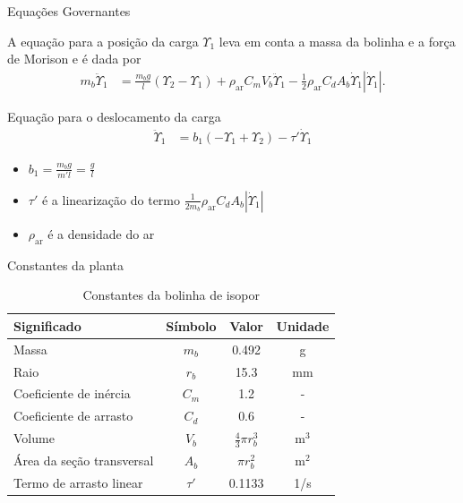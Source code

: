 \documentclass[10pt]{beamer}
\begin{document}
\begin{frame}[fragile]{Equações Governantes}
\begin{block}{}
A equação para a posição da carga $\Upsilon_1$ leva em conta a massa da bolinha e a força de Morison e é dada por \begin{align}
 	m_b \ddot{\Upsilon}_1 &= \frac{m_b g}{l}\left(\Upsilon_2 - \Upsilon_1\right) + \rho_{\mathrm{ar}} C_m V_b \ddot{\Upsilon}_1 - \frac{1}{2}\rho_{\textrm{ar}} C_d A_b \dot{\Upsilon}_1 \left|\dot{\Upsilon}_1\right|.\label{upsilon1previa}
 \end{align} 	
\end{block}

\begin{block}{Equação para o deslocamento da carga}
	\begin{align}
 	\ddot{\Upsilon}_1 &= b_1\left(-\Upsilon_1 + \Upsilon_2\right) - \tau'\dot{\Upsilon}_1\label{upsilon1final}
 \end{align}
\end{block}

\begin{itemize}
	\item $b_1 = \frac{m_b g}{m'l} = \frac{g}{l}$
	\item $\tau'$ é a linearização do termo $\frac{1}{2m_b}\rho_{\textrm{ar}} C_d A_b \left|\dot{\Upsilon}_1\right|$
	\item $\rho_{\textrm{ar}}$ é a densidade do ar
\end{itemize}
	
\end{frame}


\begin{frame}[fragile]{Constantes da planta}

\begin{block}{}
\begin{table}[!ht]
	\centering
	\caption{Constantes da bolinha de isopor\label{constanteIsopor}}
	\begin{tabular}{|l|c|c|c|}
		\hline
		\textbf{Significado} & \textbf{Símbolo} & \textbf{Valor} & \textbf{Unidade}\\ \hline \hline
		Massa & $m_{b}$ & 0.492 & g\\ \hline
		Raio & $r_{b}$ & 15.3 & mm\\ \hline
		Coeficiente de inércia & $C_m$ & 1.2 & - \\ \hline
		Coeficiente de arrasto & $C_d$ & 0.6 & - \\ \hline
		Volume & $V_b$ & $\frac{4}{3}\pi r_b^3$ & $\textrm{m}^3$ \\ \hline
		Área da seção transversal & $A_b$ & $\pi r_b^2$ & m$^2$\\ \hline
		Termo de arrasto linear & $\tau'$ & 0.1133 & 1/s\\ \hline
	\end{tabular}
	
\end{table}

\end{block}	
\end{frame}
\end{document}
